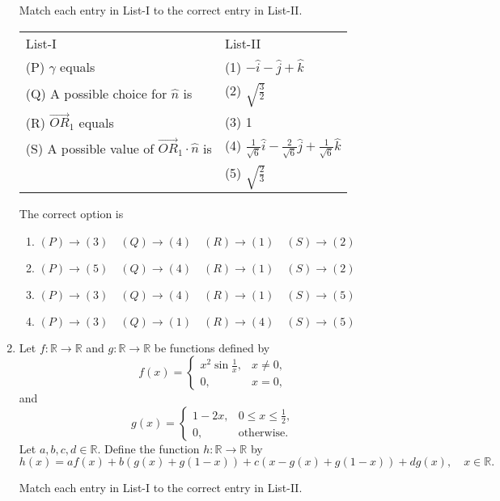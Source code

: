 \documentclass[12pt,a4paper]{article}
\begin{document}
\begin{enumerate}
Match each entry in List-I to the correct entry in List-II.

\begin{tabular}{ll}
List-I & List-II \\
(P) $\gamma$ equals & (1) $-\hat{i}-\hat{j}+\hat{k}$ \\
(Q) A possible choice for $\hat{n}$ is & (2) $\sqrt{\frac{3}{2}}$ \\
(R) $\vec{OR}_{1}$ equals & (3) 1 \\
(S) A possible value of $\vec{OR}_{1}\cdot\hat{n}$ is & (4) $\frac{1}{\sqrt{6}}\hat{i}-\frac{2}{\sqrt{6}}\hat{j}+\frac{1}{\sqrt{6}}\hat{k}$ \\
& (5) $\sqrt{\frac{2}{3}}$
\end{tabular}

The correct option is
\begin{enumerate}
    \item $ (P) \rightarrow (3) \quad (Q) \rightarrow (4) \quad (R) \rightarrow (1) \quad (S) \rightarrow (2) $
    \item $ (P) \rightarrow (5) \quad (Q) \rightarrow (4) \quad (R) \rightarrow (1) \quad (S) \rightarrow (2) $
    \item $ (P) \rightarrow (3) \quad (Q) \rightarrow (4) \quad (R) \rightarrow (1) \quad (S) \rightarrow (5) $
    \item $ (P) \rightarrow (3) \quad (Q) \rightarrow (1) \quad (R) \rightarrow (4) \quad (S) \rightarrow (5) $
\end{enumerate}
\item Let $f: \mathbb{R} \to \mathbb{R}$ and $g: \mathbb{R} \to \mathbb{R}$ be functions defined by
\[
f(x) =
\begin{cases} 
x^2 \sin \frac{1}{x}, & x \ne 0, \\
0, & x = 0,
\end{cases}
\]
and 
\[
g(x) = 
\begin{cases} 
1-2x, & 0 \le x \le \frac{1}{2}, \\
0, & \text{otherwise}.
\end{cases}
\]
Let $a, b, c, d \in \mathbb{R}$. Define the function $h: \mathbb{R} \to \mathbb{R}$ by
\[
h(x) = af(x) + b(g(x) + g(1-x)) + c(x - g(x) + g(1-x)) + d g(x), \quad x \in \mathbb{R}.
\]

Match each entry in List-I to the correct entry in List-II.


\end{enumerate}
\end{document}
